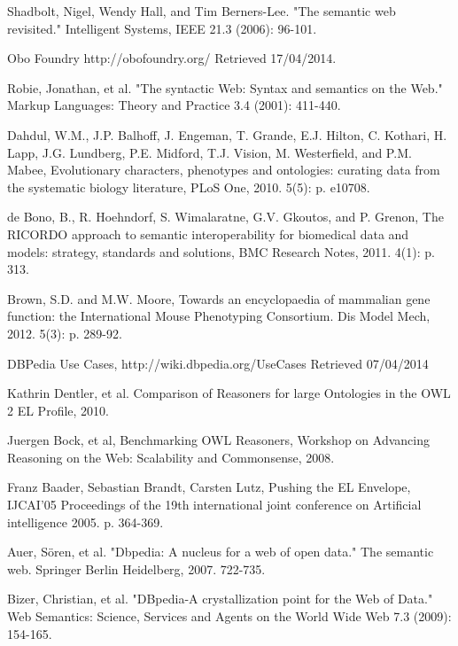 \documentclass{article}
\begin{document}
\begin{thebibliography}{9}
  Shadbolt, Nigel, Wendy Hall, and Tim Berners-Lee. "The semantic web
  revisited." Intelligent Systems, IEEE 21.3 (2006): 96-101.

  Obo Foundry
  http://obofoundry.org/
  Retrieved 17/04/2014.

  Robie, Jonathan, et al. 
  "The syntactic Web: Syntax and semantics on the Web."
  Markup Languages: Theory and Practice 3.4 
  (2001): 411-440.

  Dahdul, W.M., J.P. Balhoff, J. Engeman, T. Grande, E.J. Hilton, C. Kothari, H. Lapp, J.G. Lundberg, P.E. Midford, T.J. Vision, M. Westerfield, and P.M. Mabee, 
  Evolutionary characters, phenotypes and ontologies: curating data from the systematic biology literature,
  PLoS One,
  2010. 5(5): p. e10708.

  de Bono, B., R. Hoehndorf, S. Wimalaratne, G.V. Gkoutos, and P. Grenon, 
  The RICORDO approach to semantic interoperability for biomedical data and models: strategy, standards
and solutions, 
  BMC Research Notes, 
  2011. 4(1): p. 313.

  Brown, S.D. and M.W. Moore,
  Towards an encyclopaedia of mammalian gene function: the International Mouse Phenotyping Consortium. 
  Dis Model Mech, 
  2012. 5(3): p. 289-92.

  DBPedia Use Cases,
  http://wiki.dbpedia.org/UseCases
  Retrieved 07/04/2014

  Kathrin Dentler, et al.
  Comparison of Reasoners for large Ontologies in the OWL 2 EL Profile,
  2010.

  Juergen Bock, et al,
  Benchmarking OWL Reasoners,
  Workshop on Advancing Reasoning on the Web: Scalability and Commonsense,
  2008.

  Franz Baader, Sebastian Brandt, Carsten Lutz,
  Pushing the EL Envelope,
  IJCAI'05 Proceedings of the 19th international joint conference on Artificial intelligence
  2005. p. 364-369.

  Auer, Sören, et al. "Dbpedia: A nucleus for a web of open data." The semantic
  web. Springer Berlin Heidelberg, 2007. 722-735.

  Bizer, Christian, et al. "DBpedia-A crystallization point for the Web of
  Data." Web Semantics: Science, Services and Agents on the World Wide Web 7.3
  (2009): 154-165.


\end{thebibliography}
\end{document}
